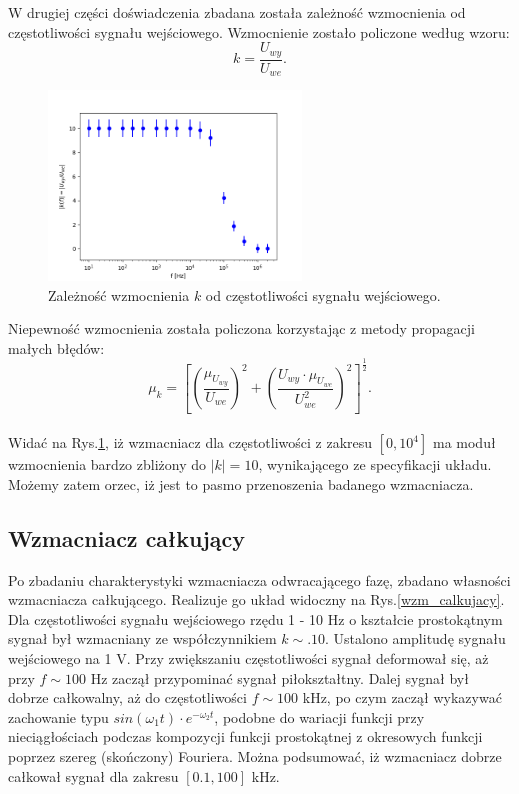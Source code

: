 \documentclass[11pt,a4paper]{article}
\begin{document}
W drugiej części doświadczenia zbadana została zależność wzmocnienia od częstotliwości sygnału wejściowego. 
Wzmocnienie zostało policzone według wzoru:
$$ k = \frac{U_{wy}}{U_{we}}. $$
 \begin{figure}[ht!]	
	\begin{center}
		\includegraphics[width = 0.6\textwidth]{Figure_2.png}
		\caption{Zależność wzmocnienia $k$ od częstotliwości sygnału wejściowego.}
		\label{wykres2}
	\end{center}
\end{figure}	
Niepewność wzmocnienia została policzona korzystając z metody propagacji małych błędów:
$$ \mu_k = [ (\frac{\mu_{U_{wy}}}{U_{we}})^2 + ( \frac{U_{wy}\cdot \mu_{U_{we}}}{U_{we}^2} )^2 ]^{\frac{1}{2}}.$$ \\
Widać na Rys.\ref{wykres2}, iż wzmacniacz dla częstotliwości z zakresu $[0, 10^4]$ ma moduł wzmocnienia bardzo zbliżony do $|k|=10$, wynikającego ze specyfikacji układu. Możemy zatem orzec, iż jest to pasmo przenoszenia badanego wzmacniacza.

\subsection*{Wzmacniacz całkujący}
Po zbadaniu charakterystyki wzmacniacza odwracającego fazę, zbadano własności wzmacniacza całkującego. Realizuje go układ widoczny na Rys.\ref{wzm_calkujacy}. Dla częstotliwości sygnału wejściowego rzędu 1 - 10 Hz o kształcie prostokątnym sygnał był wzmacniany ze współczynnikiem $k \sim. 10.$ Ustalono amplitudę sygnału wejściowego na 1 V. Przy zwiększaniu częstotliwości sygnał deformował się, aż przy $f \sim 100$ Hz zaczął przypominać sygnał piłokształtny. Dalej sygnał był dobrze całkowalny, aż do częstotliwości $f \sim 100$ kHz, po czym zaczął wykazywać zachowanie typu $sin(\omega_1 t) \cdot e^{-\omega_2 t}$, podobne do wariacji funkcji przy nieciągłościach podczas kompozycji funkcji prostokątnej z okresowych funkcji poprzez szereg (skończony) Fouriera. Można podsumować, iż wzmacniacz dobrze całkował sygnał dla zakresu $[0.1, 100]$ kHz.
\end{document}
